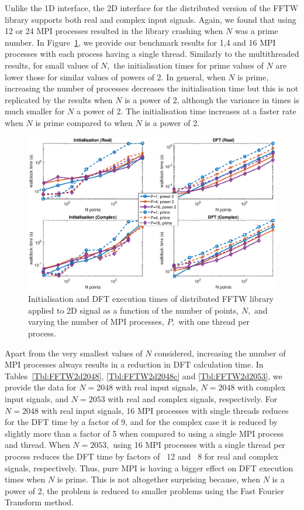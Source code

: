 \documentclass[a4paper]{article}
\begin{document}
Unlike the 1D interface, the 2D interface for the distributed version
of the FFTW library supports both real and complex input
signals. Again, we found that using 12 or 24 MPI processes resulted in
the library crashing when $N$ was a prime number. In
Figure~\ref{2DDistFFTW}, we provide our benchmark results for 1,4 and
16 MPI processes with each process having a single thread. Similarly
to the multithreaded results, for small values of $N,$ the
initialisation times for prime values of $N$ are lower those for
similar values of powers of 2. In general, when $N$ is prime,
increasing the number of processes decreases the initialisation time
but this is not replicated by the results when $N$ is a power of 2,
although the variance in times is much smaller for $N$ a power of
2. The initialisation time increases at a faster rate when $N$ is
prime compared to when $N$ is a power of 2.


\begin{figure}[htb]
    \centering
    \includegraphics[width=0.9\linewidth]{../results/fftw_2d_mpi.eps}
  \caption{Initialisation and DFT execution times of distributed FFTW library applied to 2D signal as a function of the
    number of points, $N,$ and varying the number of MPI processes, $P,$ with one thread per process.}
  \label{2DDistFFTW}
\end{figure}

Apart from the very smallest values of $N$ considered, increasing the
number of MPI processes always results in a reduction in DFT
calculation time. In Tables~\ref{Tbl:FFTW2d2048},
\ref{Tbl:FFTW2d2048c} and \ref{Tbl:FFTW2d2053}, we provide the data
for $N=2048$ with real input signals, $N=2048$ with complex input
signals, and $N=2053$ with real and complex signals, respectively. For
$N=2048$ with real input signals, 16 MPI processes with single threads
reduces for the DFT time by a factor of 9, and for the complex case it
is reduced by slightly more than a factor of 5 when compared to using
a single MPI process and thread. When $N=2053,$ using 16 MPI processes
with a single thread per process reduces the DFT time by factors of
~12 and ~8 for real and complex signals, respectively. Thus, pure MPI
is having a bigger effect on DFT execution times when $N$ is
prime. This is not altogether surprising because, when $N$ is a power
of 2, the problem is reduced to smaller problems using the Fast
Fourier Transform method.
\end{document}
